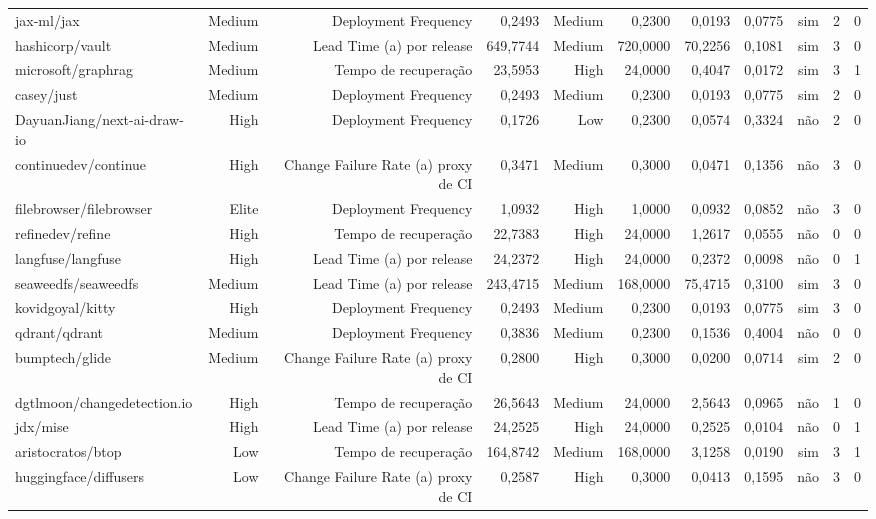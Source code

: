 \begin{tabular}{lrrrrrrrrrr}
jax-ml/jax & Medium & Deployment Frequency & 0,2493 & Medium & 0,2300 & 0,0193 & 0,0775 & sim & 2 & 0 \\
hashicorp/vault & Medium & Lead Time (a) por release & 649,7744 & Medium & 720,0000 & 70,2256 & 0,1081 & sim & 3 & 0 \\
microsoft/graphrag & Medium & Tempo de recuperação & 23,5953 & High & 24,0000 & 0,4047 & 0,0172 & sim & 3 & 1 \\
casey/just & Medium & Deployment Frequency & 0,2493 & Medium & 0,2300 & 0,0193 & 0,0775 & sim & 2 & 0 \\
DayuanJiang/next-ai-draw-io & High & Deployment Frequency & 0,1726 & Low & 0,2300 & 0,0574 & 0,3324 & não & 2 & 0 \\
continuedev/continue & High & Change Failure Rate (a) proxy de CI & 0,3471 & Medium & 0,3000 & 0,0471 & 0,1356 & não & 3 & 0 \\
filebrowser/filebrowser & Elite & Deployment Frequency & 1,0932 & High & 1,0000 & 0,0932 & 0,0852 & não & 3 & 0 \\
refinedev/refine & High & Tempo de recuperação & 22,7383 & High & 24,0000 & 1,2617 & 0,0555 & não & 0 & 0 \\
langfuse/langfuse & High & Lead Time (a) por release & 24,2372 & High & 24,0000 & 0,2372 & 0,0098 & não & 0 & 1 \\
seaweedfs/seaweedfs & Medium & Lead Time (a) por release & 243,4715 & Medium & 168,0000 & 75,4715 & 0,3100 & sim & 3 & 0 \\
kovidgoyal/kitty & High & Deployment Frequency & 0,2493 & Medium & 0,2300 & 0,0193 & 0,0775 & sim & 3 & 0 \\
qdrant/qdrant & Medium & Deployment Frequency & 0,3836 & Medium & 0,2300 & 0,1536 & 0,4004 & não & 0 & 0 \\
bumptech/glide & Medium & Change Failure Rate (a) proxy de CI & 0,2800 & High & 0,3000 & 0,0200 & 0,0714 & sim & 2 & 0 \\
dgtlmoon/changedetection.io & High & Tempo de recuperação & 26,5643 & Medium & 24,0000 & 2,5643 & 0,0965 & não & 1 & 0 \\
jdx/mise & High & Lead Time (a) por release & 24,2525 & High & 24,0000 & 0,2525 & 0,0104 & não & 0 & 1 \\
aristocratos/btop & Low & Tempo de recuperação & 164,8742 & Medium & 168,0000 & 3,1258 & 0,0190 & sim & 3 & 1 \\
huggingface/diffusers & Low & Change Failure Rate (a) proxy de CI & 0,2587 & High & 0,3000 & 0,0413 & 0,1595 & não & 3 & 0 \\

\end{tabular}
